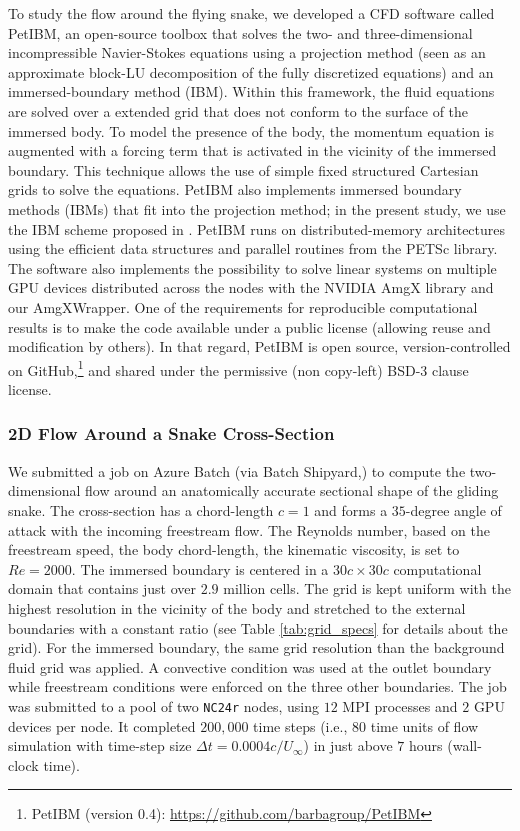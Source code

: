 \documentclass[10pt,journal,compsoc]{IEEEtran}
\begin{document}
To study the flow around the flying snake, we developed a CFD software called PetIBM\cite{chuang_et_al_2018}, an open-source toolbox that solves the two- and three-dimensional incompressible Navier-Stokes equations using a projection method (seen as an approximate block-LU decomposition of the fully discretized equations\cite{perot_1993}) and an immersed-boundary method (IBM).
Within this framework, the fluid equations are solved over a extended grid that does not conform to the surface of the immersed body.
To model the presence of the body, the momentum equation is augmented with a forcing term that is activated in the vicinity of the immersed boundary.
This technique allows the use of simple fixed structured Cartesian grids to solve the equations.
PetIBM also implements immersed boundary methods (IBMs) that fit into the projection method; in the present study, we use the IBM scheme proposed in \cite{li_et_al_2016}.
PetIBM runs on distributed-memory architectures using the efficient data structures and parallel routines from the PETSc library.
The software also implements the possibility to solve linear systems on multiple GPU devices distributed across the nodes with the NVIDIA AmgX library and our AmgXWrapper\cite{chuang_barba_2017}.
One of the requirements for reproducible computational results is to make the code available under a public license (allowing reuse and modification by others).
In that regard, PetIBM is open source, version-controlled on GitHub,\footnote{PetIBM (version 0.4): \url{https://github.com/barbagroup/PetIBM}} and shared under the permissive (non copy-left) BSD-3 clause license.

\subsubsection{2D Flow Around a Snake Cross-Section}

We submitted a job on Azure Batch (via Batch Shipyard,) to compute the two-dimensional flow around an anatomically accurate sectional shape of the gliding snake.
The cross-section has a chord-length $c=1$ and forms a $35$-degree angle of attack with the incoming freestream flow.
The Reynolds number, based on the freestream speed, the body chord-length, the kinematic viscosity, is set to $Re=2000$.
The immersed boundary is centered in a $30c \times 30c$ computational domain that contains just over $2.9$ million cells.
The grid is kept uniform with the highest resolution in the vicinity of the body and stretched to the external boundaries with a constant ratio (see Table \ref{tab:grid_specs} for details about the grid).
For the immersed boundary, the same grid resolution than the background fluid grid was applied.
A convective condition was used at the outlet boundary while freestream conditions were enforced on the three other boundaries.
The job was submitted to a pool of two \texttt{NC24r} nodes, using $12$ MPI processes and $2$ GPU devices per node.
It completed $200,000$ time steps (i.e., $80$ time units of flow simulation with time-step size $\Delta t = 0.0004 c / U_\infty$) in just above $7$ hours (wall-clock time).
\end{document}
